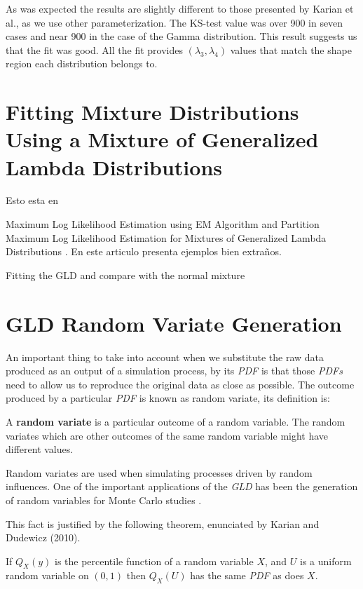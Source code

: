 As was expected the results are slightly different to those presented by Karian et al., as we use other parameterization. The KS-test value was over 900 in seven cases and near 900 in the case of the Gamma distribution. This result suggests us that the fit was good. All the fit provides $(\lambda_{3}, \lambda_{4})$ values that match the shape region each distribution belongs to.


\section{Fitting Mixture Distributions Using a Mixture of Generalized Lambda Distributions}\label{sec:gld_mixture}
Esto esta en \cite{Tobergte2013}

Maximum Log Likelihood Estimation using EM Algorithm and Partition Maximum Log Likelihood Estimation for Mixtures of Generalized Lambda Distributions  \cite{Su2011}. En este articulo presenta ejemplos bien extraños.

Fitting the GLD and compare with the normal mixture \cite{Ning2008}

\section{GLD Random Variate Generation}\label{sec:gld_random_variate}
An important thing to take into account when we substitute the raw data produced as an output of a simulation process, by its \textit{PDF} is that those \textit{PDFs} need to allow us to reproduce the original data as close as possible. The outcome produced by a particular \textit{PDF} is known as random variate, its definition is:

\begin{defn} 
A \textbf{random variate} is a particular outcome of a random variable. The random variates which are other outcomes of the same random variable might have different values.
\end{defn}

Random variates are used when simulating processes driven by random influences. One of the important applications of the \textit{GLD} has been the generation of random variables for Monte Carlo studies \cite{Mustafa2016}.

This fact is justified by the following theorem, enunciated by Karian and Dudewicz (2010).

\begin{thm}
If $Q_{X}(y)$ is the percentile function of a random variable $X$, and $U$ is a uniform random variable
on $(0, 1)$ then $Q_{X}(U)$ has the same \textit{PDF} as does $X$.
\end{thm}

